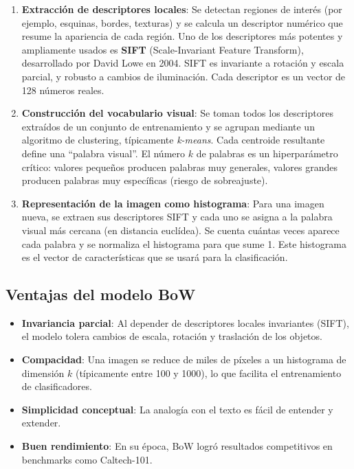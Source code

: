 \documentclass{article}
\begin{document}
\begin{enumerate}
    \item \textbf{Extracción de descriptores locales}: Se detectan regiones de interés (por ejemplo, esquinas, bordes, texturas) y se calcula un descriptor numérico que resume la apariencia de cada región. Uno de los descriptores más potentes y ampliamente usados es \textbf{SIFT} (Scale-Invariant Feature Transform), desarrollado por David Lowe en 2004. SIFT es invariante a rotación y escala parcial, y robusto a cambios de iluminación. Cada descriptor es un vector de 128 números reales.

    \item \textbf{Construcción del vocabulario visual}: Se toman todos los descriptores extraídos de un conjunto de entrenamiento y se agrupan mediante un algoritmo de clustering, típicamente \textit{k-means}. Cada centroide resultante define una “palabra visual”. El número $k$ de palabras es un hiperparámetro crítico: valores pequeños producen palabras muy generales, valores grandes producen palabras muy específicas (riesgo de sobreajuste).

    \item \textbf{Representación de la imagen como histograma}: Para una imagen nueva, se extraen sus descriptores SIFT y cada uno se asigna a la palabra visual más cercana (en distancia euclídea). Se cuenta cuántas veces aparece cada palabra y se normaliza el histograma para que sume 1. Este histograma es el vector de características que se usará para la clasificación.
\end{enumerate}

\subsection{Ventajas del modelo BoW}
\begin{itemize}
    \item \textbf{Invariancia parcial}: Al depender de descriptores locales invariantes (SIFT), el modelo tolera cambios de escala, rotación y traslación de los objetos.
    \item \textbf{Compacidad}: Una imagen se reduce de miles de píxeles a un histograma de dimensión $k$ (típicamente entre 100 y 1000), lo que facilita el entrenamiento de clasificadores.
    \item \textbf{Simplicidad conceptual}: La analogía con el texto es fácil de entender y extender.
    \item \textbf{Buen rendimiento}: En su época, BoW logró resultados competitivos en benchmarks como Caltech-101.
\end{itemize}
\end{document}
